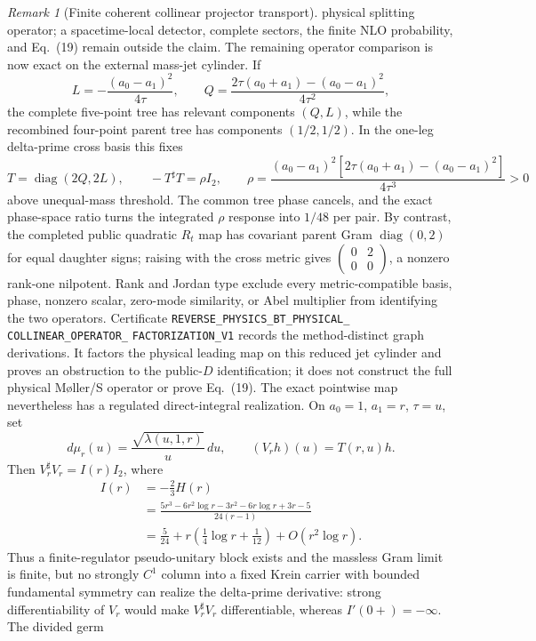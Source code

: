\documentclass[11pt]{article}
\theoremstyle{definition}
\theoremstyle{remark}
\newtheorem{remark}[theorem]{Remark}
\begin{document}
\begin{remark}[Finite coherent collinear projector transport]
physical splitting operator; a spacetime-local detector, complete sectors,
the finite NLO probability, and Eq.~(19) remain outside the claim.
The remaining operator comparison is now exact on the external mass-jet
cylinder.  If
\[
 L=-\frac{(a_0-a_1)^2}{4\tau},\qquad
 Q=\frac{2\tau(a_0+a_1)-(a_0-a_1)^2}{4\tau^2},
\]
the complete five-point tree has relevant components $(Q,L)$, while the
recombined four-point parent tree has components $(1/2,1/2)$.  In the
one-leg delta-prime cross basis this fixes
\[
 T=\operatorname{diag}(2Q,2L),\qquad
 -T^\sharp T=\rho I_2,\qquad
 \rho=\frac{(a_0-a_1)^2
 [2\tau(a_0+a_1)-(a_0-a_1)^2]}{4\tau^3}>0
\]
above unequal-mass threshold.  The common tree phase cancels, and the exact
phase-space ratio turns the integrated $\rho$ response into $1/48$ per pair.
By contrast, the completed public quadratic $R_t$ map has covariant parent
Gram $\operatorname{diag}(0,2)$ for equal daughter signs; raising with the
cross metric gives
$\left(\begin{smallmatrix}0&2\\0&0\end{smallmatrix}\right)$, a nonzero
rank-one nilpotent.  Rank and Jordan type exclude every metric-compatible
basis, phase, nonzero scalar, zero-mode similarity, or Abel multiplier from
identifying the two operators.  Certificate
\texttt{REVERSE\_PHYSICS\_BT\_PHYSICAL\_}
\allowbreak\texttt{COLLINEAR\_OPERATOR\_}
\allowbreak\texttt{FACTORIZATION\_V1}
records the method-distinct graph derivations.  It factors the physical
leading map on this reduced jet cylinder and proves an obstruction to the
public-$D$ identification; it does not construct the full physical
M\o ller/S operator or prove Eq.~(19).
The exact pointwise map nevertheless has a regulated direct-integral
realization.  On $a_0=1$, $a_1=r$, $\tau=u$, set
\[
 d\mu_r(u)=\frac{\sqrt{\lambda(u,1,r)}}u\,du,
 \qquad (V_rh)(u)=T(r,u)h .
\]
Then $V_r^\sharp V_r=I(r)I_2$, where
\[
 \begin{aligned}
 I(r)&=-\frac23H(r)\\
 &=\frac{5r^3-6r^2\log r-3r^2-6r\log r+3r-5}{24(r-1)}\\
 &=\frac5{24}+r\left(\frac14\log r+\frac1{12}\right)
 +O(r^2\log r).
 \end{aligned}
\]
Thus a finite-regulator pseudo-unitary block exists and the massless Gram
limit is finite, but no strongly $C^1$ column into a fixed Krein carrier with
bounded fundamental symmetry can realize the delta-prime derivative:
strong differentiability of $V_r$ would make $V_r^\sharp V_r$
differentiable, whereas $I'(0+)=-\infty$.  The divided germ

\end{remark}
\end{document}
